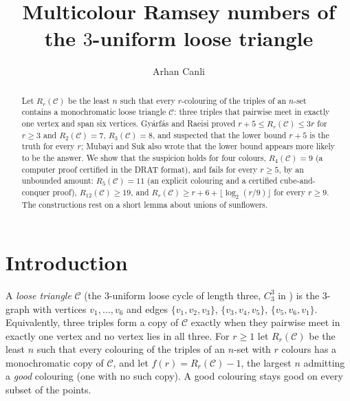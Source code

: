 \documentclass[11pt]{amsart}
\theoremstyle{definition}
\theoremstyle{remark}
\newcommand{\C}{\mathcal{C}}
\begin{document}
\title{Multicolour Ramsey numbers of the $3$-uniform loose triangle}

\author{Arhan Canli}
\address{Quantavane, Dubai, United Arab Emirates}


\begin{abstract}
Let $R_r(\C)$ be the least $n$ such that every $r$-colouring of the triples of an $n$-set contains a monochromatic
loose triangle $\C$: three triples that pairwise meet in exactly one vertex and span six vertices.
Gy\'arf\'as and Raeisi proved $r+5\le R_r(\C)\le 3r$ for $r\ge3$ and $R_2(\C)=7$, $R_3(\C)=8$, and suspected that
the lower bound $r+5$ is the truth for every $r$; Mubayi and Suk also wrote that the lower bound appears more likely
to be the answer. We show that the suspicion holds for four colours, $R_4(\C)=9$ (a computer proof certified in the
DRAT format), and fails for every $r\ge5$, by an unbounded amount: $R_5(\C)=11$ (an explicit colouring and a
certified cube-and-conquer proof), $R_{12}(\C)\ge19$, and
$R_r(\C)\ge r+6+\lfloor\log_2(r/9)\rfloor$ for every $r\ge9$. The constructions rest on a short lemma about unions of
sunflowers.
\end{abstract}

\maketitle

\section{Introduction}

A \emph{loose triangle} $\C$ (the $3$-uniform loose cycle of length three, $C^3_3$ in \cite{GR}) is the $3$-graph
with vertices $v_1,\dots,v_6$ and edges $\{v_1,v_2,v_3\}$, $\{v_3,v_4,v_5\}$, $\{v_5,v_6,v_1\}$. Equivalently, three
triples form a copy of $\C$ exactly when they pairwise meet in exactly one vertex and no vertex lies in all three.
For $r\ge1$ let $R_r(\C)$ be the least $n$ such that every colouring of the triples of an $n$-set with $r$ colours has
a monochromatic copy of $\C$, and let $f(r)=R_r(\C)-1$, the largest $n$ admitting a \emph{good} colouring (one with no
such copy). A good colouring stays good on every subset of the points.
\end{document}

